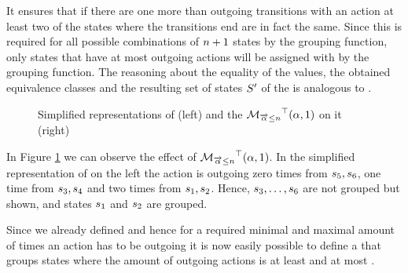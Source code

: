 \documentclass[preview]{standalone}
\begin{document}
It ensures that if there are one more than \numoutact outgoing transitions with an action \action at least two of the states where the transitions end are in fact the same. Since this is required for all possible combinations of ${n} + 1$ states by the grouping function, only states that have at most \numoutact outgoing actions will be assigned with \remelem by the grouping function. The reasoning about the equality of the \grpfctN values, the obtained equivalence classes and the resulting set of states ${S}'$ of the \viewN is analogous to \viewminoutaction.

\begin{figure}[h]
	\begin{minipage}{.5\textwidth}
		\hspace{5mm}
		
	\end{minipage}%
	\begin{minipage}{.5\textwidth}
		\hspace{5mm}
		
	\end{minipage}
	\caption{Simplified representations of \mdp (left) and the \viewN ${{{{{\mathcal{M}}}}_{{{\overrightarrow{{\alpha}}}\leq{n}}}}^{\top}}({\alpha},1)$ on it (right)}
	\label{fig:outActMaxAfter} 
\end{figure}

In Figure \ref{fig:outActMaxAfter} we can observe the effect of ${{{{{\mathcal{M}}}}_{{{\overrightarrow{{\alpha}}}\leq{n}}}}^{\top}}({\alpha},1)$. In the simplified representation of \achgphN on the left the action \action is outgoing zero times from ${s}_5, {s}_6$, one time from ${s}_3, {s}_4$ and two times from ${s}_1, {s}_2$. Hence, ${s}_3, \dots, {s}_6$ are not grouped but shown, and states ${s}_1$ and ${s}_2$ are grouped.

Since we already defined \grpfctsN and hence \viewsN for a required minimal and maximal amount of times an action has to be outgoing it is now easily possible to define a \viewN that groups states where the amount of outgoing actions is at least \numoutact and at most \numoutactb. 
\end{document}
